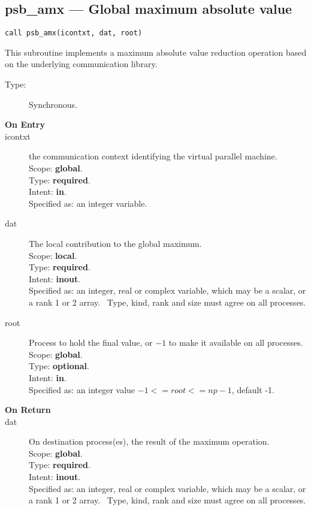 \clearpage\subsection*{psb\_amx --- Global maximum absolute value}

\begin{verbatim}
call psb_amx(icontxt, dat, root)
\end{verbatim}

This subroutine implements a maximum absolute value reduction
operation based on the underlying communication library. 
\begin{description}
\item[Type:] Synchronous.
\item[\bf  On Entry ]
\item[icontxt] the communication context identifying the virtual
  parallel machine.\\
Scope: {\bf global}.\\
Type: {\bf required}.\\
Intent: {\bf in}.\\
Specified as: an integer variable.
\item[dat] The local contribution to the global maximum.\\
Scope: {\bf local}.\\
Type: {\bf required}.\\
Intent: {\bf inout}.\\
Specified as: an integer, real or complex variable, which may be a
scalar, or a rank 1 or 2 array. \
Type, kind, rank and size must agree on all processes.
\item[root] Process to hold the final value, or $-1$ to make it available
  on all processes.\\
Scope: {\bf global}.\\
Type: {\bf optional}.\\
Intent: {\bf in}.\\
Specified as: an integer value $-1<= root <= np-1$, default -1. \\
\end{description}


\begin{description}
\item[\bf On Return]
\item[dat] On destination process(es), the result of the maximum operation.\\
Scope: {\bf global}.\\
Type: {\bf required}.\\
Intent: {\bf inout}.\\
Specified as: an integer, real or complex variable, which may be a
scalar, or a rank 1 or 2 array. \
Type, kind, rank and size must agree on all processes.
\end{description}


